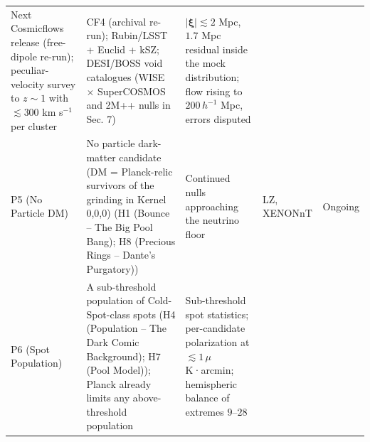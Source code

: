 \documentclass[
  11pt,
]{article}
\begin{document}
\begin{longtable}[]{@{}lllll@{}}
\begin{minipage}[t]{0.19\columnwidth}
Next Cosmicflows release (free-dipole re-run); peculiar-velocity survey
to \(z \sim 1\) with \(\lesssim 300\) km s\(^{-1}\) per cluster\strut
\end{minipage} & \begin{minipage}[t]{0.19\columnwidth}\raggedright
CF4 (archival re-run); Rubin/LSST + Euclid + kSZ; DESI/BOSS void
catalogues (WISE \(\times\) SuperCOSMOS and 2M++ nulls in Sec. 7)\strut
\end{minipage} & \begin{minipage}[t]{0.19\columnwidth}\raggedright
\(|\boldsymbol{\xi}| \lesssim 2\) Mpc, \(1.7\) Mpc residual inside the
mock distribution; flow rising to \(200\,h^{-1}\) Mpc, errors
disputed\strut
\end{minipage}\tabularnewline
\begin{minipage}[t]{0.11\columnwidth}\raggedright
P5 (No Particle DM)\strut
\end{minipage} & \begin{minipage}[t]{0.19\columnwidth}\raggedright
No particle dark-matter candidate (DM = Planck-relic survivors of the
grinding in Kernel 0,0,0) (H1 (Bounce -- The Big Pool Bang); H8
(Precious Rings -- Dante's Purgatory))\strut
\end{minipage} & \begin{minipage}[t]{0.19\columnwidth}\raggedright
Continued nulls approaching the neutrino floor\strut
\end{minipage} & \begin{minipage}[t]{0.19\columnwidth}\raggedright
LZ, XENONnT\strut
\end{minipage} & \begin{minipage}[t]{0.19\columnwidth}\raggedright
Ongoing\strut
\end{minipage}\tabularnewline
\begin{minipage}[t]{0.11\columnwidth}\raggedright
P6 (Spot Population)\strut
\end{minipage} & \begin{minipage}[t]{0.19\columnwidth}\raggedright
A sub-threshold population of Cold-Spot-class spots (H4 (Population --
The Dark Comic Background); H7 (Pool Model)); Planck already limits any
above-threshold population\strut
\end{minipage} & \begin{minipage}[t]{0.19\columnwidth}\raggedright
Sub-threshold spot statistics; per-candidate polarization at
\(\lesssim 1\,\mu\)K·arcmin; hemispheric balance of extremes
\(9\)--\(28\)\strut
\end{minipage} & \begin{minipage}[t]{0.19\columnwidth}\raggedright

\end{minipage}
\end{longtable}
\end{document}
